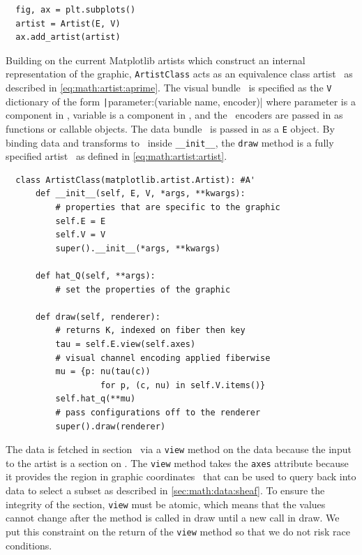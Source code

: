 \documentclass[journal]{vgtc}                %
\begin{document}
\begin{verbatim}
  fig, ax = plt.subplots()
  artist = Artist(E, V)
  ax.add_artist(artist)
\end{verbatim}
Building on the current Matplotlib artists which construct an internal representation of the graphic, \texttt{ArtistClass} acts as an equivalence class artist \vartisteq\ as described in \autoref{eq:math:artist:aprime}. The visual bundle \vtotal\ is specified as the \texttt{V} dictionary of the form \texttt|{parameter:(variable name, encoder)}| where parameter is a component in \vfiber, variable is a component in \dfiber, and the \vchannel\ encoders are passed in as functions or callable objects. The data bundle \dtotal\ is passed in as a \texttt{E} object. By binding data and transforms to \vartisteq\ inside \texttt{__init__}, the \texttt{draw} method is a fully specified artist \vartist\ as defined in \autoref{eq:math:artist:artist}.
\begin{verbatim}
  class ArtistClass(matplotlib.artist.Artist): #A'
      def __init__(self, E, V, *args, **kwargs):
          # properties that are specific to the graphic
          self.E = E
          self.V = V 
          super().__init__(*args, **kwargs)
  
      def hat_Q(self, **args): 
          # set the properties of the graphic
  
      def draw(self, renderer):
          # returns K, indexed on fiber then key 
          tau = self.E.view(self.axes) 
          # visual channel encoding applied fiberwise 
          mu = {p: nu(tau(c))
                   for p, (c, nu) in self.V.items()} 
          self.hat_q(**mu)
          # pass configurations off to the renderer
          super().draw(renderer)
  \end{verbatim}
 The data is fetched in section \dsection\ via a \texttt{view} method on the data because the input to the artist is a section on \dtotal. The \texttt{view} method takes the \texttt{axes} attribute because it provides the region in graphic coordinates \gbase\ that can be used to query back into data to select a subset as described in \autoref{sec:math:data:sheaf}. To ensure the integrity of the section, \texttt{view} must be atomic, which means that the values cannot change after the method is called in draw until a new call in draw. We put this constraint on the return of the \texttt{view} method so that we do not risk race conditions. 
 
\end{document}
